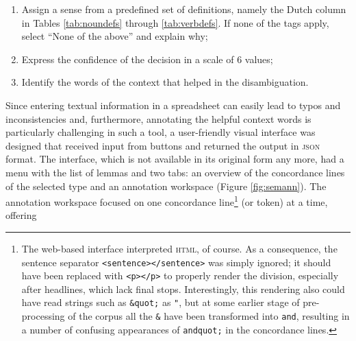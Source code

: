 \documentclass[
]{book}
\providecommand{\tightlist}{%
  \setlength{\itemsep}{0pt}\setlength{\parskip}{0pt}}
\begin{document}
\begin{enumerate}
\def\labelenumi{\arabic{enumi}.}
\tightlist
\item
  Assign a sense from a predefined set of definitions, namely the Dutch column in Tables \ref{tab:noundefs} through \ref{tab:verbdefs}. If none of the tags apply, select ``None of the above'' and explain why;
\item
  Express the confidence of the decision in a scale of 6 values;
\item
  Identify the words of the context that helped in the disambiguation.
\end{enumerate}

Since entering textual information in a spreadsheet can easily lead to typos and inconsistencies and, furthermore, annotating the helpful context words is particularly challenging in such a tool, a user-friendly visual interface was designed that received input from buttons and returned the output in \textsc{json} format.
The interface, which is not available in its original form any more, had a menu with the list of lemmas and two tabs: an overview of the concordance lines of the selected type and an annotation workspace (Figure \ref{fig:semann}). The annotation workspace focused on one concordance line\footnote{The web-based interface interpreted \textsc{html}, of course. As a consequence, the sentence separator \texttt{\textless{}sentence\textgreater{}\textless{}/sentence\textgreater{}} was simply ignored; it should have been replaced with \texttt{\textless{}p\textgreater{}\textless{}/p\textgreater{}} to properly render the division, especially after headlines, which lack final stops. Interestingly, this rendering also could have read strings such as \texttt{\&quot;} as \texttt{"}, but at some earlier stage of pre-processing of the corpus all the \texttt{\&} have been transformed into \texttt{and}, resulting in a number of confusing appearances of \texttt{andquot;} in the concordance lines.} (or token) at a time, offering
\end{document}
